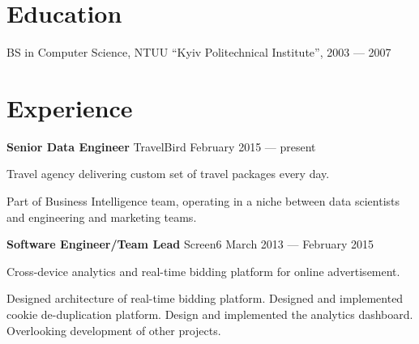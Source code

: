 \documentclass[margin]{res}
\begin{document}

\address{{\bf Mailing address} \\ Czaar Peterstraat 103B \\ 1018PE, Amsterdam, The Netherlands}

\address{{\bf Contacts} \\ +31 62 980 61 41 \\ contact@mishkovskyi.net \\ \href{https://github.com/mishok13}{mishok13@GitHub}}

\begin{resume}


\section{Education}
BS in Computer Science, NTUU ``Kyiv Politechnical Institute'', 2003 --- 2007

\section{Experience}

{\bf Senior Data Engineer} TravelBird \hfill February 2015 --- present

Travel agency delivering custom set of travel packages every day.

Part of Business Intelligence team, operating in a niche between data
scientists and engineering and marketing teams.

{\bf Software Engineer/Team Lead} Screen6 \hfill March 2013 --- February 2015

Cross-device analytics and real-time bidding platform for online
advertisement.

Designed architecture of real-time bidding platform. Designed and
implemented cookie de-duplication platform. Design and implemented the
analytics dashboard. Overlooking development of other projects.


\end{resume}
\end{document}
